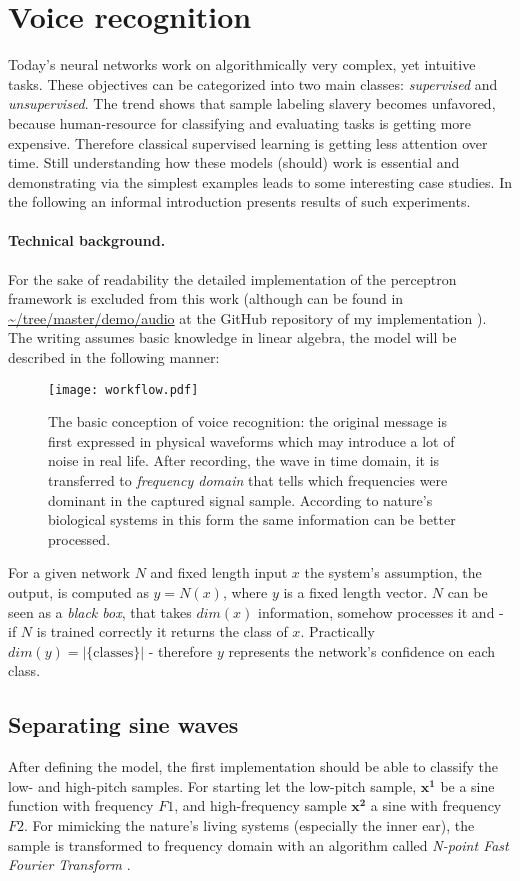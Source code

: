 \section{Voice recognition}\label{sec:voice}

Today's neural networks work on algorithmically very complex, yet 
intuitive tasks. These objectives can be categorized into two main 
classes: \emph{supervised} and \emph{unsupervised}. 
The trend shows that sample labeling slavery becomes unfavored, 
because human-resource for classifying and evaluating tasks is getting more expensive.
Therefore classical supervised learning is getting less attention over time. 
Still understanding how these models (should) work is essential and 
demonstrating via the simplest examples leads to some interesting case 
studies. In the following an informal introduction presents results of 
such experiments.

\paragraph{Technical background.} 
For the sake of readability the detailed implementation of the perceptron 
framework is excluded from this work (although can be found in 
\url{~/tree/master/demo/audio} at the GitHub repository of my implementation \cite{DV}). 
The writing assumes basic knowledge in linear algebra, the model will be described in the following manner:
 
\begin{figure}
	\centering
	\texttt{[image: workflow.pdf]}
	\caption{
	The basic conception of voice recognition: 
	the original message is first expressed in physical waveforms which may introduce a lot of noise in real life. 
	After recording, the wave in time domain, it is transferred to \emph{frequency domain} that 
	tells which frequencies were dominant in the captured signal sample.
	According to nature's biological systems in this form the same information can be better processed.
	}
	\label{fig:workflow}
\end{figure}
For a given network $N$ and fixed length input $x$ the system's assumption, the output, is computed as $y=N(x)$, where $y$ is a fixed length vector.
$N$ can be seen as a \emph{black box}, that takes $dim(x)$ information, somehow processes it and - if $N$ is trained correctly it returns the class of $x$. Practically $dim(y)=|\{\textrm{classes}\}|$ - therefore $y$ represents the network's confidence on each class.

\subsection{Separating sine waves}
After defining the model, the first implementation should be able to classify the low- and high-pitch samples. For starting let the low-pitch sample, $\mathbf{x^1}$ be a sine function with frequency $F1$, and high-frequency sample $\mathbf{x^2}$ a sine with frequency $F2$. 
For mimicking the nature's living systems (especially the inner ear), the sample is transformed to frequency domain with an algorithm called \emph{N-point Fast Fourier Transform} \cite{welch1967use}. 
